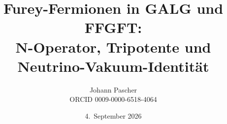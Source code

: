 \documentclass[11pt,a4paper]{report}
\title{Furey-Fermionen in GALG und FFGFT:\\[0.5em]
  \large N-Operator, Tripotente und Neutrino-Vakuum-Identität}
\date{4.~September 2026}
\author{Johann Pascher\\\small ORCID 0009-0000-6518-4064}
\begin{document}
\renewcommand{\thechapter}{}
\renewcommand{\thesection}{\arabic{section}}
\maketitle
\tableofcontents

\end{document}
